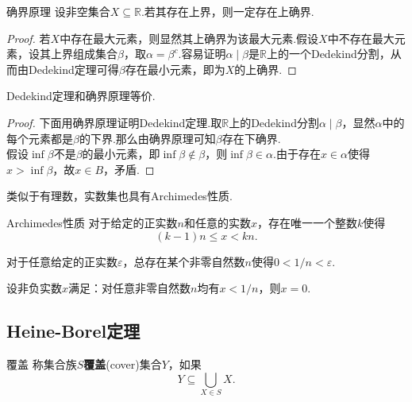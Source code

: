 \documentclass[lang=cn, zihao=5]{elegantbook}
\newcommand{\R}{\mathbb{R}}
\begin{document}
\begin{theorem}{确界原理}
	设非空集合$X \subseteq \R$.若其存在上界，则一定存在上确界.
\end{theorem}
\begin{proof}
	若$X$中存在最大元素，则显然其上确界为该最大元素.假设$X$中不存在最大元素，设其上界组成集合$\beta$，取$\alpha = \beta ^c$.容易证明$\alpha \mid \beta$是$\R$上的一个Dedekind分割，从而由Dedekind定理可得$\beta$存在最小元素，即为$X$的上确界.
\end{proof}

\begin{proposition}
	Dedekind定理和确界原理等价.
\end{proposition}
\begin{proof}
	下面用确界原理证明Dedekind定理.取$\R$上的Dedekind分割$\alpha \mid \beta$，显然$\alpha$中的每个元素都是$\beta$的下界.那么由确界原理可知$\beta$存在下确界. \\
	假设$\inf \beta$不是$\beta$的最小元素，即$\inf \beta \notin \beta$，则$\inf \beta \in \alpha$.由于存在$x \in \alpha$使得$x > \inf \beta$，故$x \in B$，矛盾.
\end{proof}

类似于有理数，实数集也具有Archimedes性质.

\begin{theorem}{Archimedes性质}
	对于给定的正实数$n$和任意的实数$x$，存在唯一一个整数$k$使得$$(k-1)n \leq x < kn.$$
\end{theorem}

\begin{corollary}
	对于任意给定的正实数$\varepsilon$，总存在某个非零自然数$n$使得$0<1/n<\varepsilon$.
\end{corollary}

\begin{corollary}
	设非负实数$x$满足：对任意非零自然数$n$均有$x<1/n$，则$x=0$.
\end{corollary}

\subsection{Heine-Borel定理}

\begin{definition}{覆盖}
	称集合族$S$\textbf{覆盖}(cover)集合$Y$，如果$$Y \subseteq \bigcup_{X \in S} X.$$
\end{definition}
\end{document}
